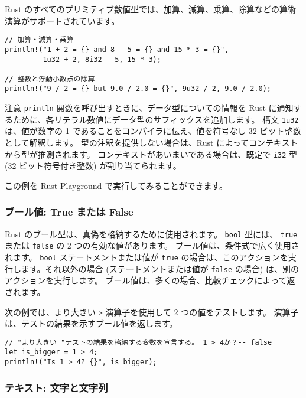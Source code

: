 Rust のすべてのプリミティブ数値型では、加算、減算、乗算、除算などの算術演算がサポートされています。


\begin{lstlisting}[numbers=none]
// 加算・減算・乗算
println!("1 + 2 = {} and 8 - 5 = {} and 15 * 3 = {}",
         1u32 + 2, 8i32 - 5, 15 * 3);

// 整数と浮動小数点の除算
println!("9 / 2 = {} but 9.0 / 2.0 = {}", 9u32 / 2, 9.0 / 2.0);
\end{lstlisting}

\begin{itembox}[l]{注意}
\texttt{println} 関数を呼び出すときに、データ型についての情報を Rust に通知するために、各リテラル数値にデータ型のサフィックスを追加します。 構文 \texttt{1u32} は、値が数字の 1 であることをコンパイラに伝え、値を符号なし 32 ビット整数として解釈します。   型の注釈を提供しない場合は、Rust によってコンテキストから型が推測されます。 コンテキストがあいまいである場合は、既定で \texttt{i32} 型 (32 ビット符号付き整数) が割り当てられます。
\end{itembox}

この例を Rust Playground で実行してみることができます。

\subsubsection{ブール値: True または False}

Rust のブール型は、真偽を格納するために使用されます。 \texttt{bool} 型には、 \texttt{true} または \texttt{false} の 2 つの有効な値があります。 ブール値は、条件式で広く使用されます。 \texttt{bool} ステートメントまたは値が \texttt{true} の場合は、このアクションを実行します。それ以外の場合 (ステートメントまたは値が \texttt{false} の場合) は、別のアクションを実行します。 ブール値は、多くの場合、比較チェックによって返されます。

次の例では、より大きい \texttt{>} 演算子を使用して 2 つの値をテストします。 演算子は、テストの結果を示すブール値を返します。

\begin{lstlisting}[numbers=none]
// "より大きい "テストの結果を格納する変数を宣言する。 1 > 4か？-- false
let is_bigger = 1 > 4;
println!("Is 1 > 4? {}", is_bigger);
\end{lstlisting}

\subsubsection{テキスト: 文字と文字列}

